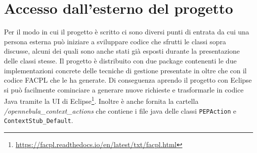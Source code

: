 \section{Accesso dall'esterno del progetto}
Per il modo in cui il progetto è scritto ci sono diversi punti di entrata da cui una persona esterna può iniziare a sviluppare codice che sfrutti le classi sopra discusse, alcuni dei quali sono anche stati già esposti durante la presentazione delle classi stesse. Il progetto è distribuito con due package contenenti le due implementazioni concrete delle tecniche di gestione presentate in \cite{10.1007/978-3-319-08260-8_6} oltre che con il codice FACPL che le ha generate. Di conseguenza aprendo il progetto con Eclipse si può facilmente cominciare a generare nuove richieste e trasformarle in codice Java tramite la UI di Eclipse\footnote{\url{https://facpl.readthedocs.io/en/latest/txt/facpl.html}}. Inoltre è anche fornita la cartella \emph{/opennebula\_context\_actions} che contiene i file java delle classi \texttt{PEPAction} e \texttt{ContextStub\_Default}.\par

